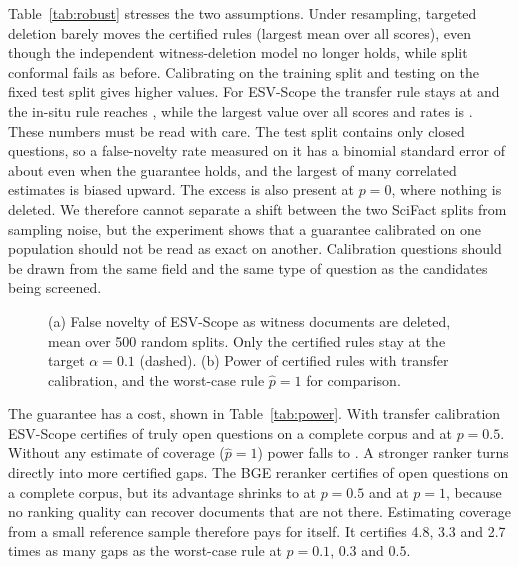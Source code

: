 \documentclass[conference,a4paper]{IEEEtran}
\theoremstyle{definition}
\begin{document}
Table~\ref{tab:robust} stresses the two assumptions. Under resampling, targeted deletion barely moves the certified rules (largest mean \RobPTAllTr{} over all scores), even though the independent witness-deletion model no longer holds, while split conformal fails as before. Calibrating on the training split and testing on the fixed test split gives higher values. For ESV-Scope the transfer rule stays at \RobHMEsvTr{} and the in-situ rule reaches \RobHMEsvIn{}, while the largest value over all scores and rates is \RobHMAllTr{}. These numbers must be read with care. The test split contains only \NholdClosed{} closed questions, so a false-novelty rate measured on it has a binomial standard error of about \SEhold{} even when the guarantee holds, and the largest of many correlated estimates is biased upward. The excess is also present at $p=0$, where nothing is deleted. We therefore cannot separate a shift between the two SciFact splits from sampling noise, but the experiment shows that a guarantee calibrated on one population should not be read as exact on another. Calibration questions should be drawn from the same field and the same type of question as the candidates being screened.

\begin{table}[t]
\centering
\caption{Largest mean false novelty over all deletion rates (target 0.10). ``All scores'' takes the maximum over every certified score. Values above 0.105 in bold.}
\label{tab:robust}

\end{table}

\begin{table}[t]
\centering
\caption{Mean false novelty of ESV-Scope over 500 random splits, target $\alpha=0.10$. Values above the target are in bold.}
\label{tab:fn}

\end{table}

\begin{figure}[t]
\centering

\caption{(a) False novelty of ESV-Scope as witness documents are deleted, mean over 500 random splits. Only the certified rules stay at the target $\alpha=0.1$ (dashed). (b) Power of certified rules with transfer calibration, and the worst-case rule $\hat p=1$ for comparison.}
\label{fig:cert}
\end{figure}

The guarantee has a cost, shown in Table~\ref{tab:power}. With transfer calibration ESV-Scope certifies \PowESVZero{} of truly open questions on a complete corpus and \PowESVHalf{} at $p=0.5$. Without any estimate of coverage ($\hat p=1$) power falls to \PowESVWorst{}. A stronger ranker turns directly into more certified gaps. The BGE reranker certifies \PowBGEZero{} of open questions on a complete corpus, but its advantage shrinks to \PowBGEHalf{} at $p=0.5$ and \PowBGEOne{} at $p=1$, because no ranking quality can recover documents that are not there. Estimating coverage from a small reference sample therefore pays for itself. It certifies 4.8, 3.3 and 2.7 times as many gaps as the worst-case rule at $p=0.1$, $0.3$ and $0.5$.
\end{document}

